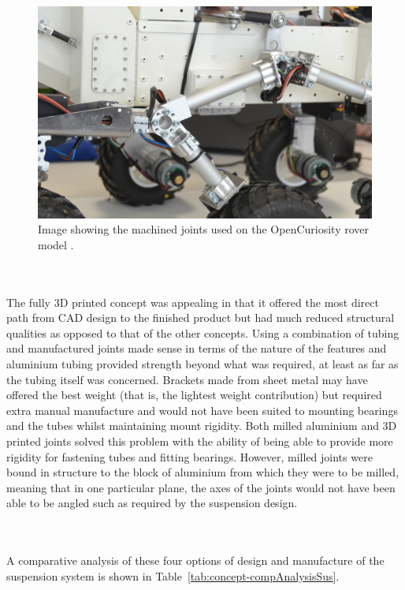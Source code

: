 \begin{itemize}
        \begin{figure}[h!]
          \centering
          \includegraphics[width=0.7\linewidth]{figures/concepts-openCuriosityMachinedJoints}
          \caption[Image showing the machined joints used on the OpenCuriosity rover model.]{Image showing the machined joints used on the OpenCuriosity rover model \cite{opencuriosity2014}.}
          \label{fig:concepts-openCuriosityMachinedJoints}
        \end{figure}
        
      \end{itemize}

      \\\\
      The fully 3D printed concept was appealing in that it offered the most direct path from CAD design to the finished product but had much reduced structural qualities as opposed to that of the other concepts. Using a combination of tubing and manufactured joints made sense in terms of the nature of the features and aluminium tubing provided strength beyond what was required, at least as far as the tubing itself was concerned. Brackets made from sheet metal may have offered the best weight (that is, the lightest weight contribution) but required extra manual manufacture and would not have been suited to mounting bearings and the tubes whilst maintaining mount rigidity. Both milled aluminium and 3D printed joints solved this problem with the ability of being able to provide more rigidity for fastening tubes and fitting bearings. However, milled joints were bound in structure to the block of aluminium from which they were to be milled, meaning that in one particular plane, the axes of the joints would not have been able to be angled such as required by the suspension design.
      
      \\\\
      A comparative analysis of these four options of design and manufacture of the suspension system is shown in Table~\ref{tab:concept-compAnalysisSus}.
      

